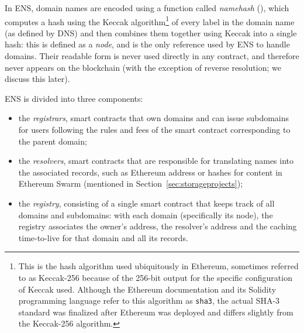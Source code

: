 \documentclass[mscthesis]{usiinfthesis}
\begin{document}
In ENS, domain names are encoded using a function called \emph{namehash} (\cite{eip:137}), which computes a hash using the Keccak algorithm\footnote{This is the hash algorithm used ubiquitously in Ethereum, sometimes referred to as Keccak-256 because of the 256-bit output for the specific configuration of Keccak used. Although the Ethereum documentation and its Solidity programming language refer to this algorithm as \texttt{sha3}, the actual SHA-3 standard was finalized after Ethereum was deployed and differs slightly from the Keccak-256 algorithm.} \cite{} %
of every label in the domain name (as defined by DNS) and then combines them together using Keccak into a single hash: this is defined as a \emph{node}, and is the only reference used by ENS to handle domains. Their readable form is never used directly in any contract, and therefore never appears on the blockchain (with the exception of reverse resolution; we discuss this later).

ENS is divided into three components:
\begin{itemize}
	\item the \emph{registrars}, smart contracts that own domains and can issue subdomains for users following the rules and fees of the smart contract corresponding to the parent domain; 
	\item the \emph{resolvers}, smart contracts that are responsible for translating names into the associated records, such as Ethereum address or hashes for content in Ethereum Swarm (mentioned in Section~\ref{sec:storageprojects});
	\item the \emph{registry}, consisting of a single smart contract that keeps track of all domains and subdomains: with each domain (specifically its node), the registry associates the owner's address, the resolver's address and the caching time-to-live for that domain and all its records.
\end{itemize}
\end{document}
